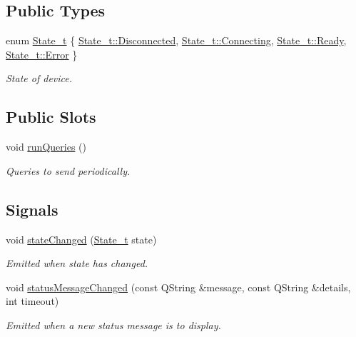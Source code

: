 \subsection*{Public Types}
\begin{DoxyCompactItemize}
\item 
enum \hyperlink{classmdt_device_a8bcf508fbd38a8f0b235e8a9b00319f6}{State\-\_\-t} \{ \hyperlink{classmdt_device_a8bcf508fbd38a8f0b235e8a9b00319f6aef70e46fd3bbc21e3e1f0b6815e750c0}{State\-\_\-t\-::\-Disconnected}, 
\hyperlink{classmdt_device_a8bcf508fbd38a8f0b235e8a9b00319f6ae321c53b354930ba96f0243e652df458}{State\-\_\-t\-::\-Connecting}, 
\hyperlink{classmdt_device_a8bcf508fbd38a8f0b235e8a9b00319f6ae7d31fc0602fb2ede144d18cdffd816b}{State\-\_\-t\-::\-Ready}, 
\hyperlink{classmdt_device_a8bcf508fbd38a8f0b235e8a9b00319f6a902b0d55fddef6f8d651fe1035b7d4bd}{State\-\_\-t\-::\-Error}
 \}
\begin{DoxyCompactList}\small\item\em State of device. \end{DoxyCompactList}\end{DoxyCompactItemize}
\subsection*{Public Slots}
\begin{DoxyCompactItemize}
\item 
void \hyperlink{classmdt_device_a14634fec6cd6bae810562b3bd88a5c05}{run\-Queries} ()
\begin{DoxyCompactList}\small\item\em Queries to send periodically. \end{DoxyCompactList}\end{DoxyCompactItemize}
\subsection*{Signals}
\begin{DoxyCompactItemize}
\item 
void \hyperlink{classmdt_device_aedb66d14aeaba33cdfd6458281ee9862}{state\-Changed} (\hyperlink{classmdt_device_a8bcf508fbd38a8f0b235e8a9b00319f6}{State\-\_\-t} state)
\begin{DoxyCompactList}\small\item\em Emitted when state has changed. \end{DoxyCompactList}\item 
void \hyperlink{classmdt_device_a3fbc6e71241e2e9daa2d8557f870c03c}{status\-Message\-Changed} (const Q\-String \&message, const Q\-String \&details, int timeout)
\begin{DoxyCompactList}\small\item\em Emitted when a new status message is to display. \end{DoxyCompactList}\end{DoxyCompactItemize}
